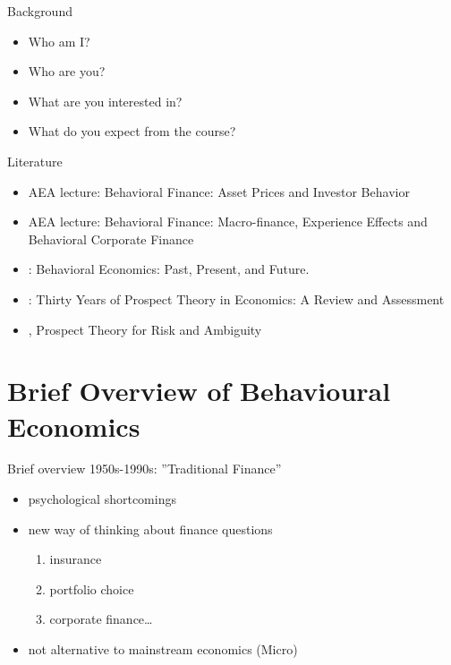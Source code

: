\begin{frame}{Background}
    \begin{itemize}
        \item Who am I?\bigskip
        \item Who are you?\bigskip
        \item What are you interested in?\bigskip
        \item What do you expect from the course?\bigskip
    \end{itemize}
\end{frame}





\begin{frame}{Literature}
    \begin{itemize}
        \item \citet{Barberis2017Talk} AEA lecture: Behavioral Finance: Asset Prices and Investor Behavior\bigskip
        \item \citet{Malmendier2017Talk} AEA lecture: Behavioral Finance: Macro-finance, Experience Effects and Behavioral Corporate Finance\bigskip
        \item \citet{Thaler2016}:  Behavioral Economics: Past, Present, and Future.\bigskip
        \item \citet{Barberis2013a}: Thirty Years of Prospect Theory in Economics: A Review and Assessment\bigskip
        \item \citet{Wakker2010}, Prospect Theory for Risk and Ambiguity\bigskip
	\end{itemize}
\end{frame}

\section{Brief Overview of Behavioural Economics}
\begin{frame}{Brief overview}
    1950s-1990s: ''Traditional Finance''\bigskip
\begin{itemize}
	\item psychological shortcomings \bigskip
    \item new way of thinking about finance questions\bigskip
        \begin{enumerate}
            \item insurance\medskip
            \item portfolio choice\medskip
            \item corporate finance\ldots
            \medskip
        \end{enumerate}
    \item not alternative to mainstream economics (Micro)\bigskip
\end{itemize}
\end{frame}

